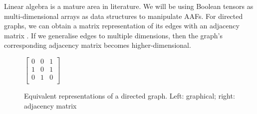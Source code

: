 Linear algebra is a mature area in literature. We will be using Boolean tensors as multi-dimensional arrays as data structures to manipulate AAFs. For directed graphs, we can obtain a matrix representation of its edges with an adjacency matrix \cite{adjmat}. If we generalise edges to multiple dimensions, then the graph's corresponding adjacency matrix becomes higher-dimensional.
\begin{figure}[H]
	\begin{center}
		\begin{minipage}{0.3\textwidth}
			\begin{center}
			\end{center}
		\end{minipage}
		\begin{minipage}{0.3\textwidth}
			\begin{center}
			$\begin{bmatrix}
			0&0&1\\
			1&0&1\\
			0&1&0\\
			\end{bmatrix}$
			\end{center}
		\end{minipage}
		
			
	\end{center}
	\caption{Equivalent representations of a directed graph. Left: graphical; right: adjacency matrix}
\end{figure}
